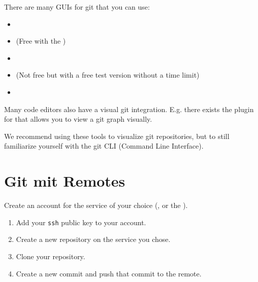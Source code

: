 \documentclass[english]{sheet}
\begin{document}
\begin{exercise}[subtitle={Git GUIs (optional)}]
    There are many GUIs for git that you can use:
    \begin{itemize}
        \item {}
        \item {} (Free with the )
        \item {}
        \item {} (Not free but with a free test version without a time limit)
        \item {}
    \end{itemize}

    Many code editors also have a visual git integration. E.g. there exists the  plugin for  that allows you to view a git graph visually.

    We recommend using these tools to visualize git repositories, but to still familiarize yourself with the git CLI (Command Line Interface).
\end{exercise}

\section{Git mit Remotes}

\begin{exercise}
    Create an account for the service of your choice (,  or the ).
\end{exercise}

\begin{exercise}[subtitle={Creation of a Github/Gitlab repository}]
    \begin{enumerate}
        \item Add your \verb|ssh| public key to your account.
        \item Create a new repository on the service you chose.
        \item Clone your repository.
        \item Create a new commit and push that commit to the remote.
    \end{enumerate}
\end{exercise}
\end{document}

